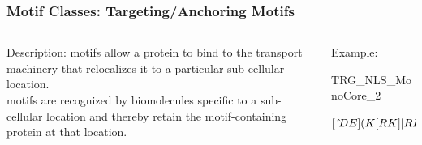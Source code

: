 \documentclass{beamer}
\begin{document}
\begin{frame}[t]\frametitle{Motif Classes: Targeting/Anchoring Motifs}
    \vspace{-5mm}
    \begin{columns}[T]
        \begin{column}{.49\textwidth}
            \begin{alertblock}{Description:}
         motifs allow a protein to bind to the transport machinery that relocalizes it to a particular sub-cellular location.\\
         motifs are recognized by biomolecules specific to a sub-cellular location and thereby retain the motif-containing protein at that location.
                \end{alertblock}
            \end{column}
            \begin{column}{.50\textwidth}
                \begin{exampleblock}{Example:}
                    \begin{description}[RegEx]
                        \item[Name] TRG\_NLS\_MonoCore\_2%
                        \item[RegEx]{\footnotesize$[~\hat{}DE](K[RK]\text{\textbar}RK)[KRP][KR][~\hat{}DE]$}%
                    \end{description}
                \end{exampleblock}
            \end{column}
        \end{columns}
    \begin{center}
    \vspace{-5mm}\begin{tikzpicture}

\end{tikzpicture}
\end{center}
\end{frame}
\end{document}
